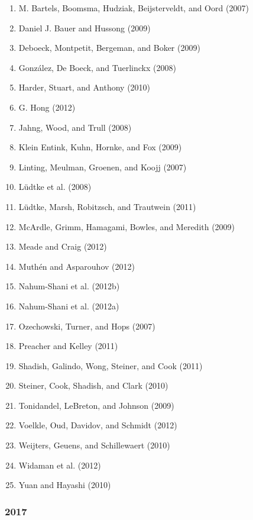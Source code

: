 \documentclass[english,man]{apa6}
\providecommand{\tightlist}{%
  \setlength{\itemsep}{0pt}\setlength{\parskip}{0pt}}
\theoremstyle{definition}
\theoremstyle{definition}
\theoremstyle{definition}
\theoremstyle{remark}
\begin{document}
\begin{enumerate}
\def\labelenumi{\arabic{enumi})}
\tightlist
\item
  M. Bartels, Boomsma, Hudziak, Beijsterveldt, and Oord (2007)
\item
  Daniel J. Bauer and Hussong (2009)
\item
  Deboeck, Montpetit, Bergeman, and Boker (2009)
\item
  González, De Boeck, and Tuerlinckx (2008)
\item
  Harder, Stuart, and Anthony (2010)
\item
  G. Hong (2012)
\item
  Jahng, Wood, and Trull (2008)
\item
  Klein Entink, Kuhn, Hornke, and Fox (2009)
\item
  Linting, Meulman, Groenen, and Koojj (2007)
\item
  Lüdtke et al. (2008)
\item
  Lüdtke, Marsh, Robitzsch, and Trautwein (2011)
\item
  McArdle, Grimm, Hamagami, Bowles, and Meredith (2009)
\item
  Meade and Craig (2012)
\item
  Muthén and Asparouhov (2012)
\item
  Nahum-Shani et al. (2012b)
\item
  Nahum-Shani et al. (2012a)
\item
  Ozechowski, Turner, and Hops (2007)
\item
  Preacher and Kelley (2011)
\item
  Shadish, Galindo, Wong, Steiner, and Cook (2011)
\item
  Steiner, Cook, Shadish, and Clark (2010)
\item
  Tonidandel, LeBreton, and Johnson (2009)
\item
  Voelkle, Oud, Davidov, and Schmidt (2012)
\item
  Weijters, Geuens, and Schillewaert (2010)
\item
  Widaman et al. (2012)
\item
  Yuan and Hayashi (2010)
\end{enumerate}

\subsubsection{2017}\label{section-35}
\end{document}
